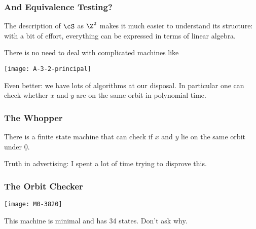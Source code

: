 \documentclass[handout,10pt]{ksbeamer}
\def\F#1{\underline{#1}}
\begin{document}




\begin{frame}
\frametitle{And Equivalence Testing?}

The description of $\cS$ as $\Z^2$ makes it much easier to understand 
its structure:
with a bit of effort, everything can be expressed in terms of linear algebra. 
\vspace{2ex} 

There is no need to deal with complicated machines like 

\begin{center}
\texttt{[image: A-3-2-principal]}
\end{center}
\vspace{1ex} 

Even better: we have lots of algorithms at our disposal. 
In particular one can check whether $x$ and $y$ are on the same orbit in polynomial time. 

\end{frame}

\begin{frame}
\frametitle{The Whopper}

\begin{theorem}
There is a finite state machine that can check if $x$ and $y$ lie on 
the same orbit under $\F{0}$. 
\end{theorem}
\vspace{10ex} 

Truth in advertising: I spent a lot of time trying to disprove this. 


\end{frame}


\begin{frame}
\frametitle{The Orbit Checker}
\vspace{-2ex}

\begin{center}
\texttt{[image: M0-3820]}
\end{center}
\vspace{-2ex}

This machine is minimal and has 34 states.  Don't ask why.  

\end{frame}
\end{document}
